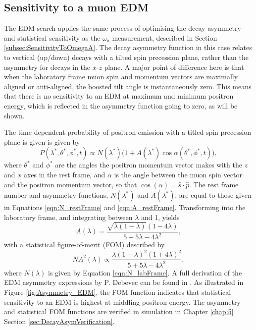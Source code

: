 \subsection{Sensitivity to a muon EDM}\label{subsec:EDMSensitivity}

The EDM search applies the same process of optimising the decay asymmetry and statistical sensitivity as the $\omega_{a}$ measurement, described in Section \ref{subsec:SensitivityToOmegaA}. The decay asymmetry function in this case relates to vertical (up/down) decays with a tilted spin precession plane, rather than the asymmetry for decays in the $x$-$z$ plane. A major point of difference here is that when the laboratory frame muon spin and momentum vectors are maximally aligned or anti-aligned, the boosted tilt angle is instantaneously zero. This means that there is no sensitivity to an EDM at maximum and minimum positron energy, which is reflected in the asymmetry function going to zero, as will be shown.

The time dependent probability of positron emission with a titled spin precession plane is given is given by
%
\begin{equation}
  P(\lambda^{*}, \theta^{*}, \phi^{*}, t) \propto N(\lambda^{*}) \Big( 1+A(\lambda^{*})\cos\alpha(\theta^{*}, \phi^{*}, t)\Big), 
\end{equation}
%
where $\theta^{*}$ and $\phi^{*}$ are the angles the positron momentum vector makes with the $z$ and $x$ axes in the rest frame, and $\alpha$ is the angle between the muon spin vector and the positron momentum vector, so that $\cos(\alpha)=\hat{s}\cdot\hat{p}$. The rest frame number and asymmetry functions, $N(\lambda^{*})$ and $A(\lambda^{*})$, are equal to those given in Equations \ref{eqn:N_restFrame} and \ref{eqn:A_restFrame}. Transforming into the laboratory frame, and integrating between $\lambda$ and 1, yields
%
\begin{equation}
  A(\lambda) = \frac{\sqrt{\lambda(1-\lambda)}(1-4\lambda)}{5+5\lambda-4\lambda^{2}},
  \label{eqn:AEDM_labFrame}
\end{equation}
%
with a statistical figure-of-merit (FOM) described by 
%
\begin{equation}
  NA^{2}(\lambda) \propto \frac{\lambda(1-\lambda)^{2}(1+4\lambda)^{2}}{5+5\lambda-4\lambda^{2}},
  \label{eqn:FOMEDM_labFrame}
\end{equation}
%
where $N(\lambda)$ is given by Equation \ref{eqn:N_labFrame}. A full derivation of the EDM asymmetry expressions by P. Debevec can be found in \cite{PaulEDMNote}. As illustrated in Figure \ref{fig:Asymmetry_EDM}, the FOM function indicates that statistical sensitivity to an EDM is highest at middling positron energy. The asymmetry and statistical FOM functions are verified in simulation in Chapter \ref{chap:5} Section \ref{sec:DecayAsymVerification}. 

